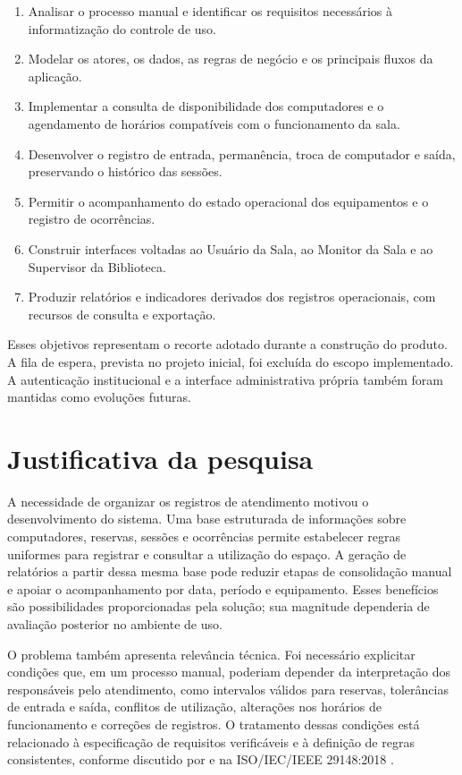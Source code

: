 \begin{enumerate}
    \item Analisar o processo manual e identificar os requisitos necessários à informatização do controle de uso.
    \item Modelar os atores, os dados, as regras de negócio e os principais fluxos da aplicação.
    \item Implementar a consulta de disponibilidade dos computadores e o agendamento de horários compatíveis com o funcionamento da sala.
    \item Desenvolver o registro de entrada, permanência, troca de computador e saída, preservando o histórico das sessões.
    \item Permitir o acompanhamento do estado operacional dos equipamentos e o registro de ocorrências.
    \item Construir interfaces voltadas ao Usuário da Sala, ao Monitor da Sala e ao Supervisor da Biblioteca.
    \item Produzir relatórios e indicadores derivados dos registros operacionais, com recursos de consulta e exportação.
\end{enumerate}

Esses objetivos representam o recorte adotado durante a construção do produto. A fila de espera, prevista no projeto inicial, foi excluída do escopo implementado. A autenticação institucional e a interface administrativa própria também foram mantidas como evoluções futuras.

\section{Justificativa da pesquisa}\label{sec:justificativa}

A necessidade de organizar os registros de atendimento motivou o desenvolvimento do sistema. Uma base estruturada de informações sobre computadores, reservas, sessões e ocorrências permite estabelecer regras uniformes para registrar e consultar a utilização do espaço. A geração de relatórios a partir dessa mesma base pode reduzir etapas de consolidação manual e apoiar o acompanhamento por data, período e equipamento. Esses benefícios são possibilidades proporcionadas pela solução; sua magnitude dependeria de avaliação posterior no ambiente de uso.

O problema também apresenta relevância técnica. Foi necessário explicitar condições que, em um processo manual, poderiam depender da interpretação dos responsáveis pelo atendimento, como intervalos válidos para reservas, tolerâncias de entrada e saída, conflitos de utilização, alterações nos horários de funcionamento e correções de registros. O tratamento dessas condições está relacionado à especificação de requisitos verificáveis e à definição de regras consistentes, conforme discutido por  e na ISO/IEC/IEEE 29148:2018 \cite{iso29148_2018}.


